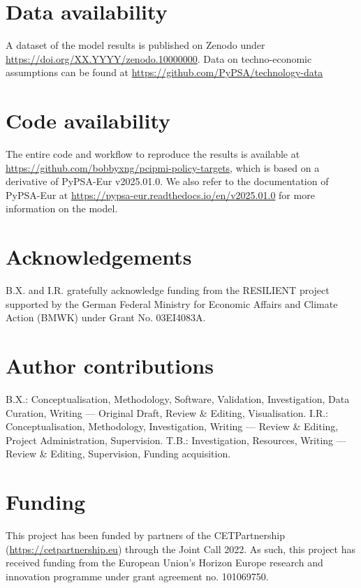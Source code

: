 \documentclass[pdflatex,sn-nature]{sn-jnl}%
\theoremstyle{thmstyleone}%
\theoremstyle{thmstyletwo}%
\theoremstyle{thmstylethree}%
\begin{document}
\backmatter

\section*{Data availability}
A dataset of the model results is published on Zenodo under \href{https://doi.org/XX.YYYY/zenodo.10000000}{https://doi.org/XX.YYYY/zenodo.10000000}. Data on techno-economic assumptions can be found at \href{https://github.com/PyPSA/technology-data}{https://github.com/PyPSA/technology-data}

\section*{Code availability}
The entire code and workflow to reproduce the results is available at \href{https://github.com/bobbyxng/pcipmi-policy-targets}{https://github.com/bobbyxng/pcipmi-policy-targets}, which is based on a derivative of PyPSA-Eur v2025.01.0. We also refer to the documentation of PyPSA-Eur at \href{https://pypsa-eur.readthedocs.io/en/v2025.01.0}{https://pypsa-eur.readthedocs.io/en/v2025.01.0} for more information on the model.

\section*{Acknowledgements}
B.X. and I.R. gratefully acknowledge funding from the RESILIENT project supported by the German Federal Ministry for Economic Affairs and Climate Action (BMWK) under Grant No. 03EI4083A. 

\section*{Author contributions}
B.X.: Conceptualisation, Methodology, Software, Validation, Investigation, Data Curation, Writing --- Original Draft, Review \& Editing, Visualisation. I.R.: Conceptualisation, Methodology, Investigation, Writing --- Review \& Editing, Project Administration, Supervision. T.B.: Investigation, Resources, Writing --- Review \& Editing, Supervision, Funding acquisition.

\section*{Funding}
This project has been funded by partners of the CETPartnership (\href{https://cetpartnership.eu}{https://cetpartnership.eu}) through the Joint Call 2022. As such, this project has received funding from the European Union's Horizon Europe research and innovation programme under grant agreement no. 101069750.
\end{document}
